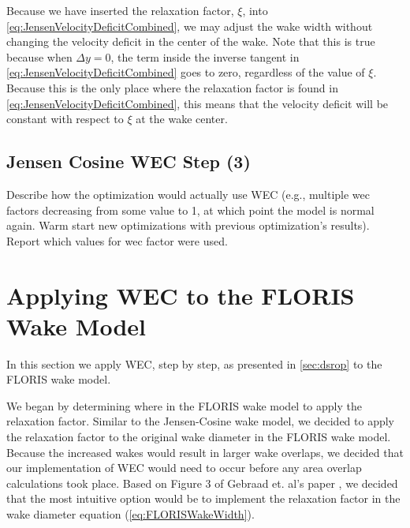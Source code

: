 \documentclass[a4paper]{jpconf}
\begin{document}
Because we have inserted the relaxation factor, $\xi$, into \cref{eq:JensenVelocityDeficitCombined}, we may adjust the wake width without changing the velocity deficit in the center of the wake. Note that this is true because when $\Delta y = 0$, the term inside the inverse tangent in \cref{eq:JensenVelocityDeficitCombined} goes to zero, regardless of the value of $\xi$. Because this is the only place where the relaxation factor is found in \cref{eq:JensenVelocityDeficitCombined}, this means that the velocity deficit will be constant with respect to $\xi$ at the wake center.

\subsection{Jensen Cosine WEC Step (3)}
Describe how the optimization would actually use WEC (e.g., multiple wec factors decreasing from some value to 1, at which point the model is normal again. Warm start new optimizations with previous optimization's results). Report which values for wec factor were used.

\section{Applying WEC to the FLORIS Wake Model}
In this section we apply WEC, step by step, as presented in \cref{sec:dsrop} to the FLORIS wake model.  


We began by determining where in the FLORIS wake model to apply the relaxation factor. Similar to the Jensen-Cosine wake model, we decided to apply the relaxation factor to the original wake diameter in the FLORIS wake model. Because the increased wakes would result in larger wake overlaps, we decided that our implementation of WEC would need to occur before any area overlap calculations took place. Based on Figure 3 of Gebraad et. al's paper \cite{Gebraad2014}, we decided that the most intuitive option would be to implement the relaxation factor in the wake diameter equation (\cref{eq:FLORISWakeWidth}).
\end{document}
